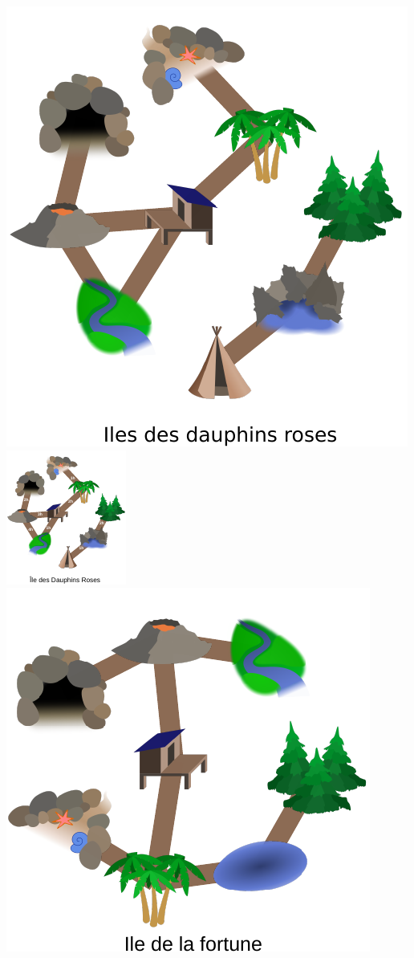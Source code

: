 \documentclass[french, landscape]{article}
\begin{document}
\centering
\newpage\includegraphics[height=\textheight]{iles/svgs/verification_et-mod/dauphins-roses.pdf}
\newpage\includegraphics[height=\textheight]{iles/svgs/verification_et-mod/dauphins-roses_temps.pdf}
\newpage\includegraphics[height=\textheight]{iles/svgs/verification_et-mod/fortune.pdf}
\end{document}

